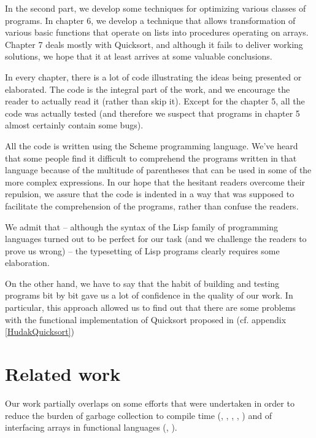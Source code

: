 In the second part, we develop some techniques for optimizing
various classes of programs. In chapter 6, we develop a technique
that allows transformation of various basic functions that operate on
lists into procedures operating on arrays. Chapter 7 deals mostly
with Quicksort, and although it fails to deliver working solutions,
we hope that it at least arrives at some valuable conclusions.

In every chapter, there is a lot of code illustrating the ideas
being presented or elaborated. The code is the integral part
of the work, and we encourage the reader to actually read it
(rather than skip it). Except for the chapter 5, all the code was
actually tested (and therefore we suspect that programs in chapter 5
almost certainly contain some bugs).

All the code is written using the Scheme programming language.
We've heard that some people find it difficult to comprehend
the programs written in that language because of the multitude
of parentheses that can be used in some of the more complex expressions.
In our hope that the hesitant readers overcome their repulsion,
we assure that the code is indented in a way that was supposed
to facilitate the comprehension of the programs, rather than
confuse the readers.

We admit that -- although the syntax of the Lisp family of
programming languages turned out to be perfect for our task
(and we challenge the readers to prove us wrong) --
the typesetting of Lisp programs clearly requires some
elaboration.

On the other hand, we have to say that the habit of building
and testing programs bit by bit gave us a lot of confidence
in the quality of our work. In particular, this approach allowed
us to find out that there are some problems with the functional
implementation of Quicksort proposed in \cite{Hudak1986} (cf.
appendix \ref{HudakQuicksort})

\section{Related work}

Our work partially overlaps on some efforts that were undertaken
in order to reduce the burden of garbage collection to compile
time (\cite{Baker1990}, \cite{Chase1987}, \cite{GopinathHennessy1989},
\cite{Hederman1988}, \cite{Hudak1986}) and of interfacing arrays
in functional languages (\cite{Baker1991}, \cite{Wadler1995}).

